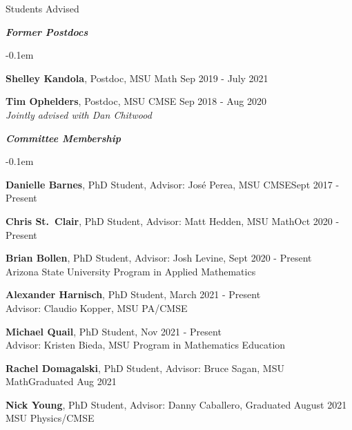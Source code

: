 \documentclass{resume} %
\begin{document}
\begin{rSection}{Students Advised}
\begin{list}{}{\leftmargin=1em}
\end{list}




\textbf{\textit{Former Postdocs}}
\begin{list}{}{\leftmargin=1em}
   \itemsep -0.1em %

   \item \textbf{Shelley Kandola}, Postdoc, MSU Math \hfill Sep 2019 - July 2021

   \item \textbf{Tim Ophelders}, Postdoc, MSU CMSE \hfill Sep 2018 - Aug 2020\\
   \phantom{XXX} \textit{Jointly advised with Dan Chitwood}
\end{list}

\textbf{\textit{Committee Membership}}
\begin{list}{}{\leftmargin=1em}
   \itemsep -0.1em %


   \item \textbf{Danielle Barnes}, PhD Student, Advisor: Jos\'e Perea, MSU CMSE\hfill Sept 2017 - Present




   \item \textbf{Chris St.~Clair}, PhD Student, Advisor: Matt Hedden, MSU Math\hfill Oct 2020 - Present
    \item \textbf{Brian Bollen}, PhD Student, Advisor: Josh Levine, \hfill Sept 2020 - Present\\
    \phantom{xxx}Arizona State University Program in Applied Mathematics
   \item \textbf{Alexander Harnisch}, PhD Student, \hfill March 2021 - Present\\
   \phantom{xxx}Advisor: Claudio Kopper, MSU PA/CMSE
   \item \textbf{Michael Quail}, PhD Student, \hfill Nov 2021 - Present\\
   \phantom{xxx}Advisor: Kristen Bieda, MSU Program in Mathematics Education

   \item \textbf{Rachel Domagalski}, PhD Student, Advisor: Bruce Sagan, MSU Math\hfill Graduated Aug 2021
   \item \textbf{Nick Young}, PhD Student, Advisor: Danny Caballero, \hfill Graduated August 2021\\
   \phantom{xxx}MSU Physics/CMSE


\end{list}
\end{rSection}
\end{document}
